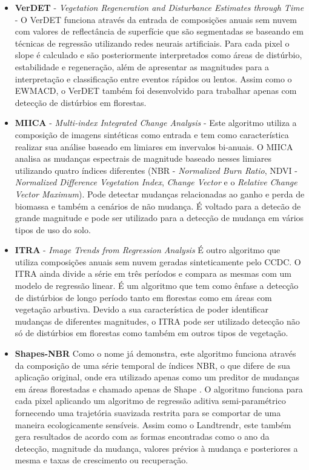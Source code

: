 \begin{itemize}
  \item \textbf{VerDET} - \textit{Vegetation Regeneration and Disturbance Estimates through Time} \citep{Hughes2017} - O VerDET funciona através da entrada de composições anuais sem nuvem com valores de reflectância de superfície que são segmentadas se baseando em técnicas de regressão utilizando redes neurais artificiais. Para cada pixel o slope é calculado e são posteriormente interpretados como áreas de distúrbio, estabilidade e regeneração, além de apresentar as magnitudes para a interpretação e classificação entre eventos rápidos ou lentos. Assim como o EWMACD, o VerDET também foi desenvolvido para trabalhar apenas com detecção de distúrbios em florestas.
  
  \item \textbf{MIICA} - \textit{Multi-index Integrated Change Analysis} \citep{JIN2013159} - Este algoritmo utiliza a composição de imagens sintéticas como entrada e tem como característica realizar sua análise baseado em limiares em invervalos bi-anuais. O MIICA analisa as mudanças espectrais de magnitude baseado nesses limiares utilizando quatro índices diferentes (NBR - \textit{Normalized Burn Ratio}, NDVI - \textit{Normalized Difference Vegetation Index}, \textit{Change Vector} e o \textit{Relative Change Vector Maximum}). Pode detectar mudanças relacionadas ao ganho e perda de biomassa e também a cenários de não mudança. É voltado para a detecão de grande magnitude e pode ser utilizado para a detecção de mudança em vários tipos de uso do solo.
  
  \item \textbf{ITRA} - \textit{Image Trends from Regression Analysis} \citep{VOGELMANN201292} É outro algoritmo que utiliza composições anuais sem nuvem geradas sinteticamente pelo CCDC. O ITRA ainda divide a série em três períodos e compara as mesmas com um modelo de regressão linear. É um algoritmo que tem como ênfase a detecção de distúrbios de longo período tanto em florestas como em áreas com vegetação arbustiva. Devido a sua característica de poder identificar mudanças de diferentes magnitudes, o ITRA pode ser utilizado detecção não só de distúrbios em florestas como também em outros tipos de vegetação.
  
  \item \textbf{Shapes-NBR} \citep{Meyer2013, Moisen2016} Como o nome já demonstra, este algoritmo funciona através da composição de uma série temporal de índices NBR, o que difere de sua aplicação original, onde era utilizado apenas como um preditor de mudanças em áreas florestadas e chamado apenas de Shape \citep{SCHROEDER2017230}. O algoritmo funciona para cada pixel aplicando um algoritmo de regressão aditiva semi-paramétrico fornecendo uma trajetória suavizada restrita para se comportar de uma maneira ecologicamente sensíveis. Assim como o Landtrendr, este também gera resultados de acordo com as formas encontradas como o ano da detecção, magnitude da mudança, valores prévios à mudança e posteriores a mesma e taxas de crescimento ou recuperação.
  
\end{itemize}

